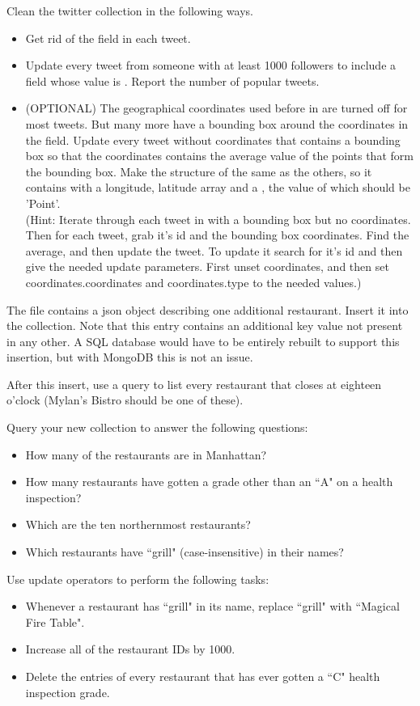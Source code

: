 Clean the twitter collection in the following ways.
\begin{itemize}
\item Get rid of the  field in each tweet.

\item Update every tweet from someone with at least 1000 followers to include a  field whose value is .
Report the number of popular tweets.

\item (OPTIONAL) The geographical coordinates used before in  are turned off for most tweets. But many more have a bounding box around the coordinates in the  field. Update every tweet without coordinates that contains a bounding box so that the coordinates contains the average value of the points that form the bounding box. Make the structure of  the same as the others, so it contains  with a longitude, latitude array and a , the value of which should be 'Point'.
\\(Hint: Iterate through each tweet in with a bounding box but no coordinates. Then for each tweet, grab it's id and the bounding box coordinates. Find the average, and then update the tweet. To update it search for it's id and then give the needed update parameters. First unset coordinates, and then set coordinates.coordinates and coordinates.type to the needed values.)
\end{itemize}

The file  contains a json object describing one additional restaurant.  Insert it into the collection. Note that this entry contains an additional key value not present in any other.  A SQL database would have to be entirely rebuilt to support this insertion, but with MongoDB this is not an issue.

After this insert, use a query to list every restaurant that closes at eighteen o'clock (Mylan's Bistro should be one of these).

Query your new collection to answer the following questions:
\begin{itemize}
\item How many of the restaurants are in Manhattan?
\item How many restaurants have gotten a grade other than an ``A" on a health inspection?
\item Which are the ten northernmost restaurants?
\item Which restaurants have ``grill" (case-insensitive) in their names?
\end{itemize}

Use update operators to perform the following tasks:
\begin{itemize}
\item Whenever a restaurant has ``grill" in its name, replace ``grill" with ``Magical Fire Table".
\item Increase all of the restaurant IDs by 1000.
\item Delete the entries of every restaurant that has ever gotten a ``C" health inspection grade.
\end{itemize}
